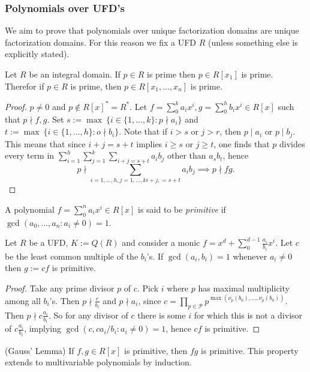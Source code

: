 \subsubsection{Polynomials over UFD's}
We aim to prove that polynomials over unique factorization domains are unique factorization domains. For this reason we fix a UFD $R$ (unless something else is explicitly stated). 
\begin{lemma}\label{PrimeInRingImpliesPrimePolynomialRing}
    Let $R$ be an integral domain. If $p\in R$ is prime then $p\in R[x_1]$ is prime. Therefor if $p\in R$ is prime, then $p\in R[x_1,\dots,x_n]$ is prime.  
\end{lemma}
\begin{proof}
    $p\neq0$ and $p\notin R[x]^\ast = R^\ast$. Let $f=\sum_0^k a_ix^i,g=\sum_0^h b_ix^i\in R[x]$ such that $p\nmid f,g$. Set $s := \max\ \{i\in\{1,\dots,k\} : p\nmid a_i\}$ and $t:= \max\ \{i\in\{1,\dots,h\} : o\nmid b_i\}$. Note that if $i>s$ or $j>r$, then $p\mid a_i$ or $p\mid b_j$. This means that since $i+j = s+t$ implies $i\geq s$ or $j\geq t$, one finds that $p$ divides every term in $\sum_{i=1}^h\sum_{j=1}^k \sum_{i+j = s+t} a_ib_j$ other than $a_sb_t$, hence $$p\nmid \sum_{i=1,\dots,h,j=1,\dots,k i+j, = s+t} a_ib_j \implies p\nmid fg.$$  
\end{proof}
\begin{definition}
    A polynomial $f=\sum_0^n a_ix^i\in R[x]$ is said to be \textit{primitive} if $\gcd(a_0,\dots,a_n:a_i\neq 0)=1$.
\end{definition}
\begin{lemma}\label{CanConstructPrimitivePolynomialOverUFDFromMonicPolynomialOverQuotientField}
    Let $R$ be a UFD, $K:=Q(R)$ and consider a monic $f=x^d+\sum_0^{d-1} \frac{a_i}{b_i}x^i$. Let $c$ be the least common multiple of the $b_i$'s. If $\gcd(a_i,b_i)=1$ whenever $a_i\neq 0$ then $g:=cf$ is primitive. 
\end{lemma}
\begin{proof}
    Take any prime divisor $p$ of $c$. Pick $i$ where $p$ has maximal multiplicity among all $b_i$'s. Then $p\nmid \frac{c}{b_i}$ and $p\nmid a_i$, since $c= \prod_{p \in \mathcal{P}} p^{\max(\nu_{p}(b_0),\dots,\nu_p(b_0))}$. Then $p\nmid c\frac{a_i}{b_i}$. So for any divisor of $c$ there is some $i$ for which this is not a divisor of $c\frac{a_i}{b_i}$, implying $\gcd(c,ca_i/b_i: a_i\neq 0)=1$, hence $cf$ is primitive.
\end{proof}
\begin{lemma}\label{GaussLemma}(Gauss' Lemma)
    If $f,g\in R[x]$ is primitive, then $fg$ is primitive. This property extends to multivariable polynomials by induction.
\end{lemma}
